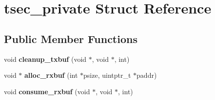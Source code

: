 \hypertarget{structtsec__private}{}\section{tsec\+\_\+private Struct Reference}
\label{structtsec__private}
\subsection*{Public Member Functions}
\begin{DoxyCompactItemize}
\item 
\mbox{\label{structtsec__private_aede6cd80d516735847c2fdf2a2abe6a3}} 
void {\bfseries cleanup\+\_\+txbuf} (void $\ast$, void $\ast$, int)
\item 
\mbox{\label{structtsec__private_acd947b9c6e5de82992d26709833d9c70}} 
void $\ast$ {\bfseries alloc\+\_\+rxbuf} (int $\ast$psize, uintptr\+\_\+t $\ast$paddr)
\item 
\mbox{\label{structtsec__private_a83c3a85c02bbfe8529cc4a7fae305b8e}} 
void {\bfseries consume\+\_\+rxbuf} (void $\ast$, void $\ast$, int)
\end{DoxyCompactItemize}
